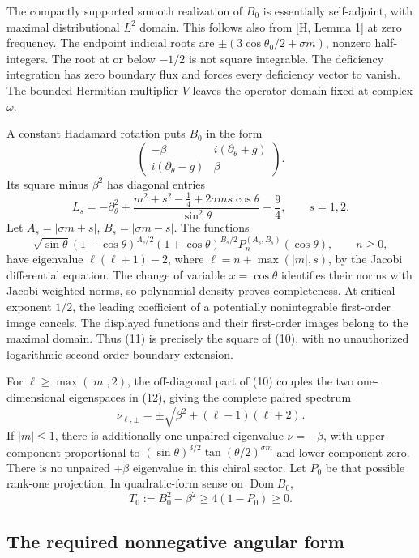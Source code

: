 \documentclass[
  10pt,
  a4paper,
]{article}
\begin{document}
The compactly supported smooth realization of \(B_0\) is essentially
self-adjoint, with maximal distributional \(L^2\) domain. This follows
also from {[}H, Lemma 1{]} at zero frequency. The endpoint indicial
roots are \(\pm(3\cos\theta_0/2+\sigma m)\), nonzero half-integers. The
root at or below \(-1/2\) is not square integrable. The deficiency
integration has zero boundary flux and forces every deficiency vector to
vanish. The bounded Hermitian multiplier \(V\) leaves the operator
domain fixed at complex \(\omega\).

A constant Hadamard rotation puts \(B_0\) in the form \[
 \begin{pmatrix}-\beta&i(\partial_\theta+g)\\
 i(\partial_\theta-g)&\beta\end{pmatrix}.
 \tag{10}
\] Its square minus \(\beta^2\) has diagonal entries \[
 L_s=-\partial_\theta^2+
 \frac{m^2+s^2-\tfrac14+2\sigma ms\cos\theta}{\sin^2\theta}
 -\frac94,\qquad s=1,2.
 \tag{11}
\] Let \(A_s=|\sigma m+s|\), \(B_s=|\sigma m-s|\). The functions \[
 \sqrt{\sin\theta}(1-\cos\theta)^{A_s/2}
 (1+\cos\theta)^{B_s/2}P_n^{(A_s,B_s)}(\cos\theta),\qquad n\ge0,
 \tag{12}
\] have eigenvalue \(\ell(\ell+1)-2\), where \(\ell=n+\max(|m|,s)\), by
the Jacobi differential equation. The change of variable
\(x=\cos\theta\) identifies their norms with Jacobi weighted norms, so
polynomial density proves completeness. At critical exponent \(1/2\),
the leading coefficient of a potentially nonintegrable first-order image
cancels. The displayed functions and their first-order images belong to
the maximal domain. Thus (11) is precisely the square of (10), with no
unauthorized logarithmic second-order boundary extension.

For \(\ell\ge\max(|m|,2)\), the off-diagonal part of (10) couples the
two one-dimensional eigenspaces in (12), giving the complete paired
spectrum \[
 \nu_{\ell,\pm}=\pm\sqrt{\beta^2+(\ell-1)(\ell+2)}.
 \tag{13}
\] If \(|m|\le1\), there is additionally one unpaired eigenvalue
\(\nu=-\beta\), with upper component proportional to
\((\sin\theta)^{3/2}\tan(\theta/2)^{\sigma m}\) and lower component
zero. There is no unpaired \(+\beta\) eigenvalue in this chiral sector.
Let \(P_0\) be that possible rank-one projection. In quadratic-form
sense on \(\operatorname{Dom}B_0\), \[
 T_0:=B_0^2-\beta^2\ge4(1-P_0)\ge0.
 \tag{14}
\]

\subsection{The required nonnegative angular
form}\label{the-required-nonnegative-angular-form}
\end{document}
